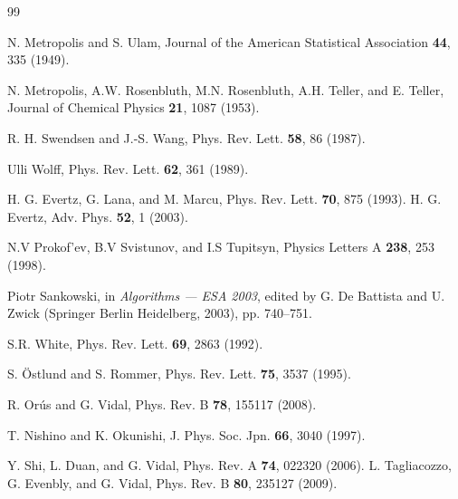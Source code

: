 \documentclass[aps,prl,nopacs,twocolumn]{revtex4}
\begin{document}
\begin{thebibliography}{99}

N. Metropolis and S. Ulam, %
Journal of the American Statistical Association {\bf 44}, 335 (1949).

N. Metropolis, A.W. Rosenbluth, M.N. Rosenbluth, A.H. Teller, and E. Teller, %
Journal of Chemical Physics \textbf{21}, 1087 (1953).

R. H. Swendsen and J.-S. Wang, %
Phys. Rev. Lett. \textbf{58}, 86 (1987).

Ulli Wolff, %
Phys. Rev. Lett. \textbf{62}, 361 (1989).

H. G. Evertz, G. Lana, and M. Marcu, Phys. Rev. Lett. {\bf 70}, 875 (1993).
H. G. Evertz, Adv. Phys. {\bf 52}, 1 (2003).

N.V Prokof'ev, B.V Svistunov, and I.S Tupitsyn, %
Physics Letters A {\bf 238}, 253 (1998).

Piotr Sankowski, in \emph{Algorithms --- ESA 2003}, edited by G. De Battista and U. Zwick (Springer Berlin Heidelberg, 2003), pp. 740--751.

S.R. White, Phys. Rev. Lett. {\bf 69}, 2863 (1992).

S. {\"O}stlund and S. Rommer, %
Phys. Rev. Lett. {\bf 75}, 3537 (1995).

R. Or{\'u}s and G. Vidal, %
Phys. Rev. B {\bf 78}, 155117 (2008).

T. Nishino and K. Okunishi, %
J. Phys. Soc. Jpn. {\bf 66}, 3040 (1997).

Y. Shi, L. Duan, and G. Vidal, Phys. Rev. A {\bf 74}, 022320 (2006).
L. Tagliacozzo, G. Evenbly, and G. Vidal, Phys. Rev. B {\bf 80}, 235127 (2009).


\end{thebibliography}
\end{document}
